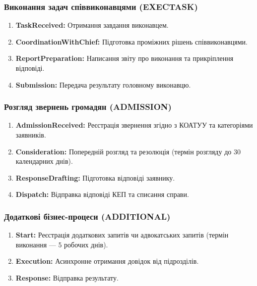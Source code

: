 \documentclass{article}
\begin{document}
\subsubsection{Виконання задач співвиконавцями (EXECTASK)}
\begin{enumerate}
    \item \textbf{TaskReceived:} Отримання завдання виконавцем.
    \item \textbf{CoordinationWithChief:} Підготовка проміжних рішень співвиконавцями.
    \item \textbf{ReportPreparation:} Написання звіту про виконання та прикріплення відповіді.
    \item \textbf{Submission:} Передача результату головному виконавцю.
\end{enumerate}

\subsubsection{Розгляд звернень громадян (ADMISSION)}
\begin{enumerate}
    \item \textbf{AdmissionReceived:} Реєстрація звернення згідно з КОАТУУ та категоріями заявників.
    \item \textbf{Consideration:} Попередній розгляд та резолюція (термін розгляду до 30 календарних днів).
    \item \textbf{ResponseDrafting:} Підготовка відповіді заявнику.
    \item \textbf{Dispatch:} Відправка відповіді КЕП та списання справи.
\end{enumerate}

\subsubsection{Додаткові бізнес-процеси (ADDITIONAL)}
\begin{enumerate}
    \item \textbf{Start:} Реєстрація додаткових запитів чи адвокатських запитів (термін виконання --- 5 робочих днів).
    \item \textbf{Execution:} Асинхронне отримання довідок від підрозділів.
    \item \textbf{Response:} Відправка результату.
\end{enumerate}
\end{document}
